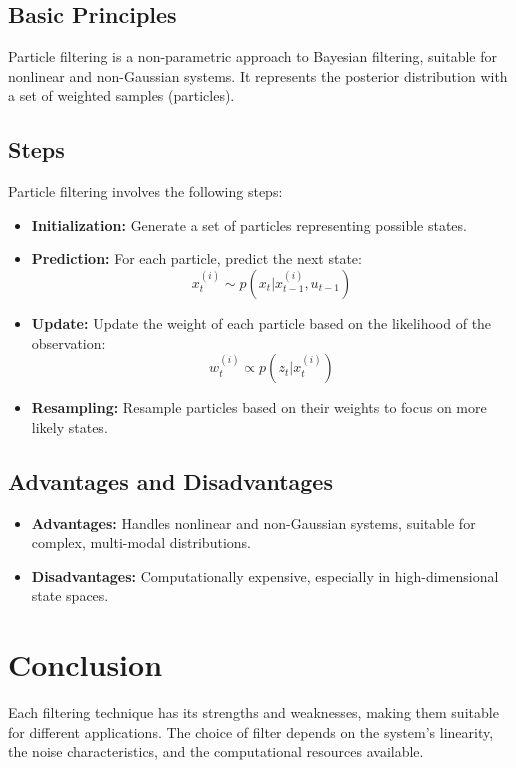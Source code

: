 \documentclass{article}
\begin{document}
\subsection{Basic Principles}
Particle filtering is a non-parametric approach to Bayesian filtering, suitable for nonlinear and non-Gaussian systems. It represents the posterior distribution with a set of weighted samples (particles).

\subsection{Steps}
Particle filtering involves the following steps:
\begin{itemize}
    \item \textbf{Initialization:} Generate a set of particles representing possible states.
    
    \item \textbf{Prediction:} For each particle, predict the next state:
\begin{equation}
x_t^{(i)} \sim p(x_t | x_{t-1}^{(i)}, u_{t-1})
\end{equation}
\item \textbf{Update:} Update the weight of each particle based on the likelihood of the observation:
\begin{equation}
w_t^{(i)} \propto p(z_t | x_t^{(i)})
\end{equation}

\item \textbf{Resampling:} Resample particles based on their weights to focus on more likely states.
\end{itemize}

\subsection{Advantages and Disadvantages}
\begin{itemize}
\item \textbf{Advantages:} Handles nonlinear and non-Gaussian systems, suitable for complex, multi-modal distributions.
\item \textbf{Disadvantages:} Computationally expensive, especially in high-dimensional state spaces.
\end{itemize}

\section{Conclusion}
Each filtering technique has its strengths and weaknesses, making them suitable for different applications. The choice of filter depends on the system’s linearity, the noise characteristics, and the computational resources available.
\end{document}
